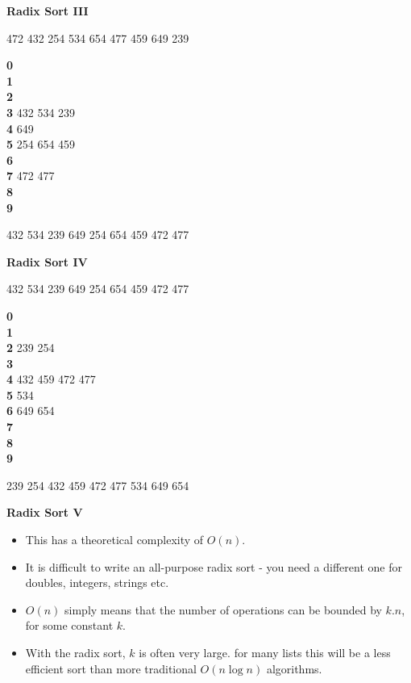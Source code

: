 \newpage
{\samepage
\begin{center}
{\Large{\bf Radix Sort III}}
\end{center}

472 432 254 534 654 477 459 649 239

{\bf 0}\\
{\bf 1}\\
{\bf 2}\\
{\bf 3} 432 534 239\\
{\bf 4} 649\\
{\bf 5} 254 654 459\\
{\bf 6}\\
{\bf 7} 472 477\\
{\bf 8}\\
{\bf 9}
}

432 534 239 649 254 654 459 472 477

\newpage
{\samepage
\begin{center}
{\Large{\bf Radix Sort IV}}
\end{center}

432 534 239 649 254 654 459 472 477

{\bf 0}\\
{\bf 1}\\
{\bf 2} 239 254\\
{\bf 3}\\
{\bf 4} 432 459 472 477\\
{\bf 5} 534\\
{\bf 6} 649 654\\
{\bf 7}\\
{\bf 8}\\
{\bf 9}

239 254 432 459 472 477 534 649 654
}

\newpage
{\samepage
\begin{center}
{\Large{\bf Radix Sort V}}
\end{center}
\begin{itemize}
\item This has a theoretical complexity of $O(n)$.
\item It is difficult to write an all-purpose radix sort - you need
a different one for doubles, integers, strings etc.
\item $O(n)$ simply means that the number of operations
can be bounded by $k.n$, for some constant $k$.
\item With the radix sort, $k$
is often very large. for many lists this will be a less efficient
sort than more traditional $O(n \log n)$ algorithms.
\end{itemize}
}

